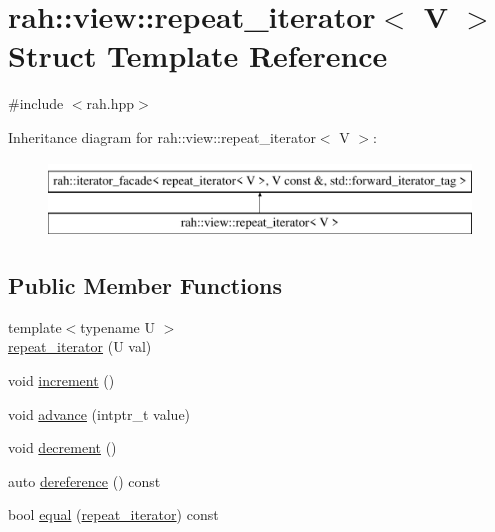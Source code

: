 \hypertarget{structrah_1_1view_1_1repeat__iterator}{}\section{rah\+::view\+::repeat\+\_\+iterator$<$ V $>$ Struct Template Reference}
\label{structrah_1_1view_1_1repeat__iterator}


{\ttfamily \#include $<$rah.\+hpp$>$}

Inheritance diagram for rah\+::view\+::repeat\+\_\+iterator$<$ V $>$\+:\begin{figure}[H]
\begin{center}
\leavevmode
\includegraphics[height=2.000000cm]{structrah_1_1view_1_1repeat__iterator}
\end{center}
\end{figure}
\subsection*{Public Member Functions}
\begin{DoxyCompactItemize}
\item 
{\footnotesize template$<$typename U $>$ }\\\mbox{\hyperlink{structrah_1_1view_1_1repeat__iterator_af91bc578d1fe7d90373896abc8e56546}{repeat\+\_\+iterator}} (U val)
\item 
void \mbox{\hyperlink{structrah_1_1view_1_1repeat__iterator_a5556f69de4c759f4fec42c12d70ea869}{increment}} ()
\item 
void \mbox{\hyperlink{structrah_1_1view_1_1repeat__iterator_ae4376a0f9f5c50828941a7df853cc5cb}{advance}} (intptr\+\_\+t value)
\item 
void \mbox{\hyperlink{structrah_1_1view_1_1repeat__iterator_ae3ed58503233856a54f9dfcf662edaf6}{decrement}} ()
\item 
auto \mbox{\hyperlink{structrah_1_1view_1_1repeat__iterator_ac7f8806f87e4cf8f5409ffeed044dd15}{dereference}} () const
\item 
bool \mbox{\hyperlink{structrah_1_1view_1_1repeat__iterator_ab42103684163bf38275999ff908d3113}{equal}} (\mbox{\hyperlink{structrah_1_1view_1_1repeat__iterator}{repeat\+\_\+iterator}}) const
\end{DoxyCompactItemize}
